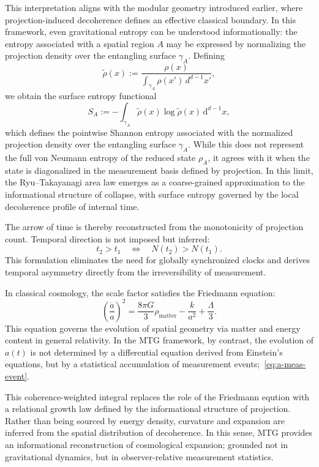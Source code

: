 \documentclass[11pt]{article}
\begin{document}
This interpretation aligns with the modular geometry introduced earlier, where projection-induced decoherence defines an effective classical boundary. In this framework, even gravitational entropy can be understood informationally: the entropy associated with a spatial region \( A \) may be expressed by normalizing the projection density over the entangling surface \( \gamma_A \). Defining
\[
\tilde{\rho}(x) := \frac{\rho(x)}{\int_{\gamma_A} \rho(x')\, d^{d-1}x'},
\]
we obtain the surface entropy functional
\begin{equation}
S_A := -\int_{\gamma_A} \tilde{\rho}(x) \log \tilde{\rho}(x) \, \mathrm{d}^{d-1}x,
\end{equation}
which defines the pointwise Shannon entropy associated with the normalized projection density over the entangling surface \( \gamma_A \). While this does not represent the full von Neumann entropy of the reduced state \( \rho_A \), it agrees with it when the state is diagonalized in the measurement basis defined by projection. In this limit, the Ryu--Takayanagi area law emerges as a coarse-grained approximation to the informational structure of collapse, with surface entropy governed by the local decoherence profile of internal time.

The arrow of time is thereby reconstructed from the monotonicity of projection count. Temporal direction is not imposed but inferred:
\begin{equation}
t_2 > t_1 \quad \Leftrightarrow \quad N(t_2) > N(t_1).
\end{equation}
This formulation eliminates the need for globally synchronized clocks and derives temporal asymmetry directly from the irreversibility of measurement.

In classical cosmology, the scale factor satisfies the Friedmann equation:
\[
\left( \frac{\dot{a}}{a} \right)^2 = \frac{8\pi G}{3} \rho_{\text{matter}} - \frac{k}{a^2} + \frac{\Lambda}{3}.
\]
This equation governs the evolution of spatial geometry via matter and energy content in general relativity. In the MTG framework, by contrast, the evolution of \( a(t) \) is not determined by a differential equation derived from Einstein's equations, but by a statistical accumulation of measurement events;~\eqref{eq:a-meas-event}.

This coherence-weighted integral replaces the role of the Friedmann eqution with a relational growth law defined by the informational structure of projection. Rather than being sourced by energy density, curvature and expansion are inferred from the spatial distribution of decoherence. In this sense, MTG provides an informational reconstruction of cosmological expansion; grounded not in gravitational dynamics, but in observer-relative measurement statistics.
\end{document}

